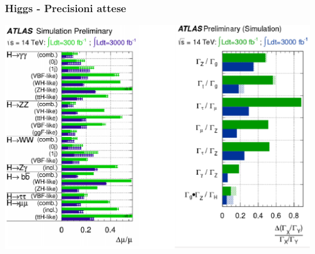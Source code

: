 \documentclass{beamer}
\begin{document}
\begin{frame}
\frametitle{Higgs - Precisioni attese}
\centering
\includegraphics[width=.9\textwidth]{Higgs_measure}
\end{frame}



\end{document}
